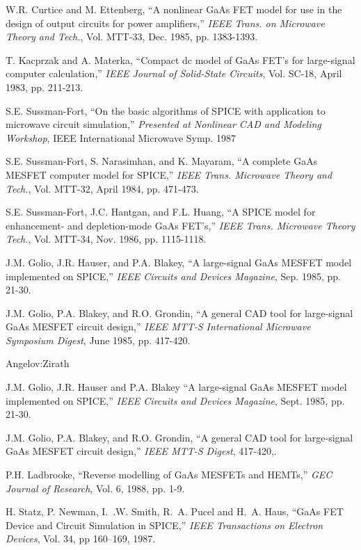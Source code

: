 \begin{thebibliography}{999}
{W.R. Curtice and M. Ettenberg, ``A nonlinear GaAs FET model for use in the
design of output circuits for power amplifiers,'' {\it IEEE Trans. on
Microwave Theory and Tech.}, Vol. MTT-33, Dec. 1985, pp. 1383-1393.} 

{T. Kacprzak and A. Materka,
``Compact dc model of GaAs FET's for large-signal computer calculation,''
{\it IEEE Journal of Solid-State Circuits},
Vol. SC-18, April 1983, pp. 211-213.} 
  
S.E. Sussman-Fort,
``On the basic algorithms of SPICE with application to microwave circuit
simulation,'' {\it Presented at Nonlinear CAD and Modeling Workshop},
IEEE International Microwave Symp. 1987

{S.E. Sussman-Fort, S. Narasimhan, and K. Mayaram,
``A complete GaAs MESFET computer model for SPICE,''
{\it IEEE Trans. Microwave Theory and Tech.},
Vol. MTT-32, April 1984, pp. 471-473.} 
 
{S.E. Sussman-Fort, J.C. Hantgan, and F.L. Huang,
``A SPICE model for enhancement- and depletion-mode GaAs FET's,''
{\it IEEE Trans. Microwave Theory Tech.},
Vol. MTT-34, Nov. 1986, pp. 1115-1118.} 

{J.M. Golio, J.R. Hauser, and P.A. Blakey,
``A large-signal GaAs MESFET model implemented on SPICE,''
{\it IEEE Circuits and Devices Magazine},
 Sep. 1985, pp. 21-30.} 
 
{J.M. Golio, P.A. Blakey, and R.O. Grondin,
``A general CAD tool for large-signal GaAs MESFET circuit design,''
{\it IEEE MTT-S International Microwave Symposium Digest},
 June 1985, pp. 417-420.} 

Angelov:Zirath

{J.M. Golio, J.R. Hauser and  P.A. Blakey
``A large-signal GaAs MESFET model implemented on SPICE,''
{\it IEEE Circuits and Devices Magazine},
 Sept. 1985, pp. 21-30.} 

{J.M. Golio, P.A. Blakey, and R.O. Grondin,
``A general CAD tool for large-signal GaAs MESFET circuit design,''
{\it IEEE MTT-S Digest},
 417-420,.} 

{P.H. Ladbrooke,
``Reverse modelling of GaAs MESFETs and HEMTs,''
{\it GEC Journal of Research},
Vol. 6, 1988, pp. 1-9.} 

H. Statz, P. Newman, I.~.W. Smith, R.~A. Pucel and H.~A. Haus,
``GaAs FET Device and Circuit Simulation in SPICE,''
{\it IEEE Transactions on Electron Devices}, Vol. 34, pp 160--169, 1987.


\end{thebibliography}
